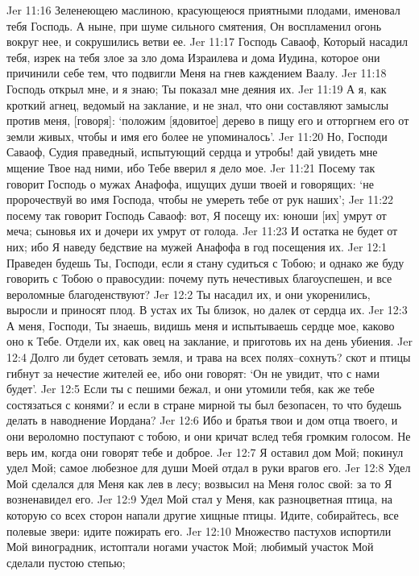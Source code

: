 Jer 11:16  Зеленеющею маслиною, красующеюся приятными плодами, именовал тебя Господь. А ныне, при шуме сильного смятения, Он воспламенил огонь вокруг нее, и сокрушились ветви ее.
Jer 11:17  Господь Саваоф, Который насадил тебя, изрек на тебя злое за зло дома Израилева и дома Иудина, которое они причинили себе тем, что подвигли Меня на гнев каждением Ваалу.
Jer 11:18  Господь открыл мне, и я знаю; Ты показал мне деяния их.
Jer 11:19  А я, как кроткий агнец, ведомый на заклание, и не знал, что они составляют замыслы против меня, [говоря]: `положим [ядовитое] дерево в пищу его и отторгнем его от земли живых, чтобы и имя его более не упоминалось'.
Jer 11:20  Но, Господи Саваоф, Судия праведный, испытующий сердца и утробы! дай увидеть мне мщение Твое над ними, ибо Тебе вверил я дело мое.
Jer 11:21  Посему так говорит Господь о мужах Анафофа, ищущих души твоей и говорящих: `не пророчествуй во имя Господа, чтобы не умереть тебе от рук наших';
Jer 11:22  посему так говорит Господь Саваоф: вот, Я посещу их: юноши [их] умрут от меча; сыновья их и дочери их умрут от голода.
Jer 11:23  И остатка не будет от них; ибо Я наведу бедствие на мужей Анафофа в год посещения их.
Jer 12:1  Праведен будешь Ты, Господи, если я стану судиться с Тобою; и однако же буду говорить с Тобою о правосудии: почему путь нечестивых благоуспешен, и все вероломные благоденствуют?
Jer 12:2  Ты насадил их, и они укоренились, выросли и приносят плод. В устах их Ты близок, но далек от сердца их.
Jer 12:3  А меня, Господи, Ты знаешь, видишь меня и испытываешь сердце мое, каково оно к Тебе. Отдели их, как овец на заклание, и приготовь их на день убиения.
Jer 12:4  Долго ли будет сетовать земля, и трава на всех полях--сохнуть? скот и птицы гибнут за нечестие жителей ее, ибо они говорят: `Он не увидит, что с нами будет'.
Jer 12:5  Если ты с пешими бежал, и они утомили тебя, как же тебе состязаться с конями? и если в стране мирной ты был безопасен, то что будешь делать в наводнение Иордана?
Jer 12:6  Ибо и братья твои и дом отца твоего, и они вероломно поступают с тобою, и они кричат вслед тебя громким голосом. Не верь им, когда они говорят тебе и доброе.
Jer 12:7  Я оставил дом Мой; покинул удел Мой; самое любезное для души Моей отдал в руки врагов его.
Jer 12:8  Удел Мой сделался для Меня как лев в лесу; возвысил на Меня голос свой: за то Я возненавидел его.
Jer 12:9  Удел Мой стал у Меня, как разноцветная птица, на которую со всех сторон напали другие хищные птицы. Идите, собирайтесь, все полевые звери: идите пожирать его.
Jer 12:10  Множество пастухов испортили Мой виноградник, истоптали ногами участок Мой; любимый участок Мой сделали пустою степью;
